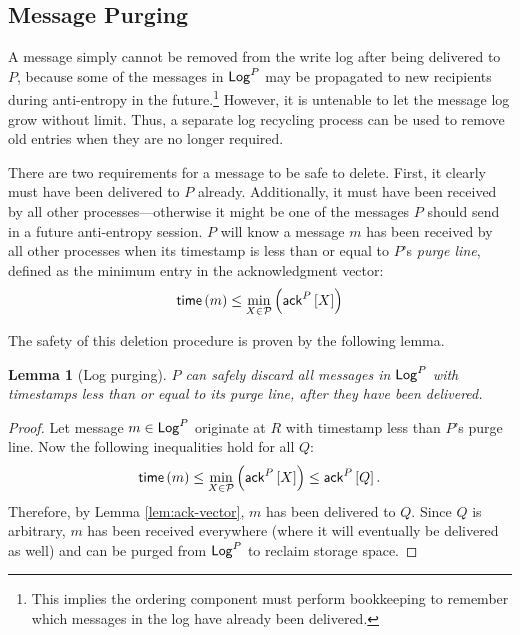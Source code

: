 \documentclass[]             %
{NASA}                       %
\newtheorem{lemma}[theorem]{Lemma}
\theoremstyle{definition}
\begin{document}
\subsection{Message Purging}
\label{ssec:tsae-message-purging}
A message simply cannot be removed from the write log after being
delivered to $P$, because some of the messages in $\mathsf{Log}^{P}$ may be
propagated to new recipients during anti-entropy in the
future.\footnote{This implies the ordering component must perform
  bookkeeping to remember which messages in the log have already been
  delivered.} However, it is untenable to let the message log grow
without limit. Thus, a separate log recycling process can be used to
remove old entries when they are no longer required.

There are two requirements for a message to be safe to delete. First,
it clearly must have been delivered to $P$ already. Additionally, it
must have been received by all other processes---otherwise it might be
one of the messages $P$ should send in a future anti-entropy
session. $P$ will know a message $m$ has been received by all
other processes when its timestamp is less than or equal to $P$'s
\emph{purge line}, defined as the minimum entry in the acknowledgment
vector:
\begin{equation}
  \label{eq:tsae-message-purging-condition}
  \mathsf{time}\left(m\right) \leq \min_{X \in \mathcal{P}} \left( \mathsf{ack}^{P}\left[X\right] \right)
\end{equation}

The safety of this deletion procedure is proven by the following
lemma.
\begin{lemma}[Log purging]
  \label{lem:purge}
  $P$ can safely discard all messages in $\mathsf{Log}^{P}$ with timestamps less
  than or equal to its purge line, after they have been delivered.
\end{lemma}
\begin{proof}
  Let message $m \in \mathsf{Log}^{P}$ originate at $R$ with timestamp less than
  $P$'s purge line. Now the following inequalities hold for all $Q$:
  \[ \mathsf{time}\left(m\right) \leq \min_{X \in \mathcal{P}}\left(\mathsf{ack}^{P}\left[X\right]\right)
    \leq \mathsf{ack}^{P}\left[Q\right].\] Therefore, by Lemma \ref{lem:ack-vector}, $m$
  has been delivered to $Q$. Since $Q$ is arbitrary, $m$ has been
  received everywhere (where it will eventually be delivered as well)
  and can be purged from $\mathsf{Log}^{P}$ to reclaim storage space.
\end{proof}

\end{document}
